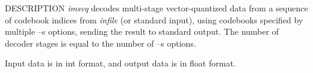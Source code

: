 % 
% 
% 
% 
%                                                                        
%

\begin{synopsis}
\item [imsvq] [ --l $L$ ] [ --n $N$ ] [ --s $S \;$ {\em cbfile} ] [ {\em infile} ]
\end{synopsis}

\begin{qsection}{DESCRIPTION}
{\em imsvq} decodes multi-stage vector-quantized data 
from a sequence of codebook indices from {\em infile} (or standard input), 
using codebooks specified by multiple --s options, 
sending the result to standard output. 
The number of decoder stages is equal to the number of --s options.

Input data is in int format, and output data is in float format.
\end{qsection}

